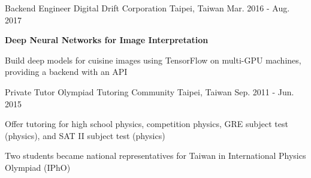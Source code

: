 \documentclass[12pt, a4paper]{awesome-cv}
\begin{document}
\begin{cventries}
    \cventry
    {Backend Engineer}
    {Digital Drift Corporation}
    {Taipei, Taiwan}
    {Mar. 2016 - Aug. 2017}
    {
        \begin{cvitems}
        \item{\bfseries Deep Neural Networks for Image Interpretation}
            \begin{cvitems}
            \item{Build deep models for cuisine images using TensorFlow on multi-GPU machines, providing a backend with an API}
            \end{cvitems}
        \end{cvitems}
    }

    \cventry
    {Private Tutor}
    {Olympiad Tutoring Community}
    {Taipei, Taiwan}
    {Sep. 2011 - Jun. 2015}
    {
        \begin{cvitems}
        \item{Offer tutoring for high school physics, competition physics, GRE subject test (physics), and SAT II subject test (physics)}
        \item{Two students became national representatives for Taiwan in International Physics Olympiad (IPhO)}
        \end{cvitems}
    }
\end{cventries}
\end{document}
